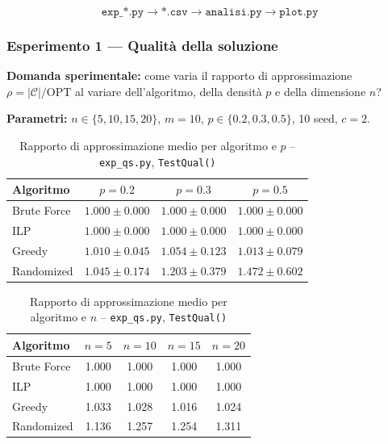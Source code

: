 \documentclass[12pt, a4paper]{article}
\begin{document}
$$\texttt{exp\_*.py} \rightarrow \texttt{*.csv} \rightarrow 
\texttt{analisi.py} \rightarrow \texttt{plot.py}$$

\subsubsection{Esperimento 1 — Qualità della soluzione}

\textbf{Domanda sperimentale:} come varia il rapporto di approssimazione 
$\rho = |\mathcal{C}| / \mathrm{OPT}$ al variare dell'algoritmo, 
della densit\`a $p$ e della dimensione $n$?

\textbf{Parametri:} $n \in \{5, 10, 15, 20\}$, $m=10$, 
$p \in \{0.2, 0.3, 0.5\}$, 10 seed, $c=2$.

\begin{table}[H]
\centering
\caption{Rapporto di approssimazione medio per algoritmo e $p$ -- 
\texttt{exp\_qs.py}, \texttt{TestQual()}}
\label{tab:exp1_p}
\begin{tabular}{lccc}
\toprule
Algoritmo & $p=0.2$ & $p=0.3$ & $p=0.5$ \\
\midrule
Brute Force  & $1.000 \pm 0.000$ & $1.000 \pm 0.000$ & $1.000 \pm 0.000$ \\
ILP          & $1.000 \pm 0.000$ & $1.000 \pm 0.000$ & $1.000 \pm 0.000$ \\
Greedy       & $1.010 \pm 0.045$ & $1.054 \pm 0.123$ & $1.013 \pm 0.079$ \\
Randomized   & $1.045 \pm 0.174$ & $1.203 \pm 0.379$ & $1.472 \pm 0.602$ \\
\bottomrule
\end{tabular}
\end{table}

\begin{table}[H]
\centering
\caption{Rapporto di approssimazione medio per algoritmo e $n$ -- 
\texttt{exp\_qs.py}, \texttt{TestQual()}}
\label{tab:exp1_n}
\begin{tabular}{lcccc}
\toprule
Algoritmo & $n=5$ & $n=10$ & $n=15$ & $n=20$ \\
\midrule
Brute Force & 1.000 & 1.000 & 1.000 & 1.000 \\
ILP         & 1.000 & 1.000 & 1.000 & 1.000 \\
Greedy      & 1.033 & 1.028 & 1.016 & 1.024 \\
Randomized  & 1.136 & 1.257 & 1.254 & 1.311 \\
\bottomrule
\end{tabular}
\end{table}
\end{document}
